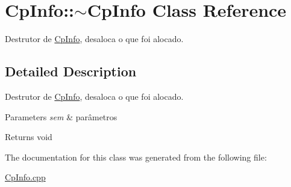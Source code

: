 \hypertarget{class_cp_info_1_1~_cp_info}{}\section{Cp\+Info\+:\+:$\sim$\+Cp\+Info Class Reference}
\label{class_cp_info_1_1~_cp_info}


Destrutor de \hyperlink{class_cp_info}{Cp\+Info}, desaloca o que foi alocado.  




\subsection{Detailed Description}
Destrutor de \hyperlink{class_cp_info}{Cp\+Info}, desaloca o que foi alocado. 


\begin{DoxyParams}{Parameters}
{\em sem} & parâmetros \\
\hline
\end{DoxyParams}
\begin{DoxyReturn}{Returns}
void 
\end{DoxyReturn}


The documentation for this class was generated from the following file\+:\begin{DoxyCompactItemize}
\item 
\hyperlink{_cp_info_8cpp}{Cp\+Info.\+cpp}\end{DoxyCompactItemize}
